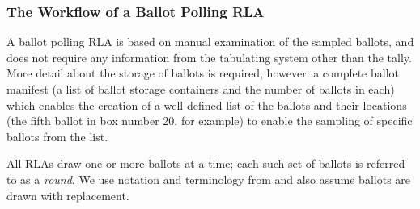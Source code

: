 \subsubsection{The Workflow of a Ballot Polling RLA}
\label{sec:polling}
A ballot polling RLA \cite{RLA} is based on manual examination of the sampled ballots, and does not require any information from the tabulating system other than the tally. 
More detail about the storage of ballots is required, however: a complete ballot manifest (a list of ballot storage containers and the number of ballots in each) which enables the creation of a well defined list of the ballots and their locations (the fifth ballot in box number 20, for example) to enable the sampling of specific ballots from the list. 

All RLAs draw one or more ballots at a time; each such set of ballots is referred to as a {\em round}. We use notation and terminology from \cite{usenix_minerva,arxiv_athena,simulations,bravo} and also assume ballots are drawn with replacement. 

